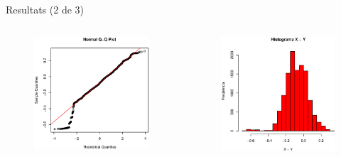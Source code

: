 \documentclass[xetex,mathserif,serif]{beamer}
\begin{document}
  \begin{frame}{Resultats (2 de 3)}
    \begin{columns}[T]
    \begin{column}{0.4\linewidth}
      \begin{figure}
      \includegraphics[width=1\linewidth]{images/qqplot}
      \end{figure}
    \end{column}
    \begin{column}{0.4\linewidth}
      \begin{figure}
      \includegraphics[width=1\linewidth]{images/histograma}
      \end{figure}
    \end{column}
    \end{columns}
  \end{frame}
  
\end{document}
